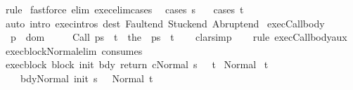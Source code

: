 \begin{isabellebody}
\ {\isacharparenleft}rule{\isacharparenright}\isanewline
{}\isamarkupfalse%
\ {\isacharparenleft}fastforce\ elim{\isacharcolon}\ exec{\isacharunderscore}elim{\isacharunderscore}cases\ {\isacharparenright}\isanewline
{}\isamarkupfalse%
\ {\isacharparenleft}cases\ s{\isacharparenright}\isanewline
{}\isamarkupfalse%
\ \ \ {\isacharparenleft}cases\ t{\isacharparenright}\isanewline
{}\isamarkupfalse%
\ {\isacharparenleft}auto\ intro{\isacharcolon}\ exec{\isachardot}intros\ dest{\isacharcolon}\ Fault{\isacharunderscore}end\ Stuck{\isacharunderscore}end\ Abrupt{\isacharunderscore}end{\isacharparenright}\isanewline
{}\isamarkupfalse%
%
\endisatagproof
{\isafoldproof}%
%
\isadelimproof
\isanewline
%
\endisadelimproof
\isanewline
{}\isamarkupfalse%
\ exec{\isacharunderscore}Call{\isacharunderscore}body{\isacharprime}{\isacharcolon}\isanewline
\ \ {\isachardoublequoteopen}p\ {\isasymin}\ dom\ {\isasymGamma}\ {\isasymLongrightarrow}\ \isanewline
\ \ {\isasymGamma}{\isasymturnstile}{\isasymlangle}Call\ p{\isacharcomma}s{\isasymrangle}\ {\isasymRightarrow}\ t\ {\isacharequal}\ {\isasymGamma}{\isasymturnstile}{\isasymlangle}the\ {\isacharparenleft}{\isasymGamma}\ p{\isacharparenright}{\isacharcomma}s{\isasymrangle}\ {\isasymRightarrow}\ t{\isachardoublequoteclose}\isanewline
%
\isadelimproof
\ \ %
\endisadelimproof
%
\isatagproof
{}\isamarkupfalse%
\ clarsimp\isanewline
\ \ \isamarkupfalse%
\ {\isacharparenleft}rule\ exec{\isacharunderscore}Call{\isacharunderscore}body{\isacharunderscore}aux{\isacharparenright}%
\endisatagproof
{\isafoldproof}%
%
\isadelimproof
\isanewline
%
\endisadelimproof
\isanewline
\isanewline
\isanewline
{}\isamarkupfalse%
\ exec{\isacharunderscore}block{\isacharunderscore}Normal{\isacharunderscore}elim\ {\isacharbrackleft}consumes\ {}{\isacharbrackright}{\isacharcolon}\isanewline
{}\ exec{\isacharunderscore}block{\isacharcolon}\ {\isachardoublequoteopen}{\isasymGamma}{\isasymturnstile}{\isasymlangle}block\ init\ bdy\ return\ c{\isacharcomma}Normal\ s{\isasymrangle}\ {\isasymRightarrow}\ \ t{\isachardoublequoteclose}\isanewline
{}\ Normal{\isacharcolon}\isanewline
\ {\isachardoublequoteopen}{\isasymAnd}t{\isacharprime}{\isachardot}\isanewline
\ \ \ \ {\isasymlbrakk}{\isasymGamma}{\isasymturnstile}{\isasymlangle}bdy{\isacharcomma}Normal\ {\isacharparenleft}init\ s{\isacharparenright}{\isasymrangle}\ {\isasymRightarrow}\ \ Normal\ t{\isacharprime}{\isacharsemicolon}\isanewline

\end{isabellebody}
